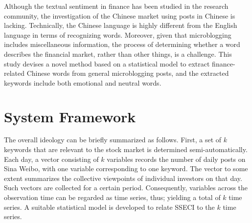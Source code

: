 \documentclass[review,3p,times,12pt,number]{elsarticle}
\begin{document}
\indent
Although the textual sentiment in finance has been studied in the research community, the investigation of the Chinese market using posts in Chinese is lacking. Technically, the Chinese language is highly different from the English language in terms of recognizing words. Moreover, given that microblogging includes miscellaneous information, the process of determining whether a word describes the financial market, rather than other things, is a challenge. This study devises a novel method based on a statistical model to extract finance-related Chinese words from general microblogging posts, and the extracted keywords include both emotional and neutral words.


\section{System Framework}
\label{sec:weibo:sf}
The overall ideology can be briefly summarized as follows. First, a set of $k$ keywords that are relevant to the stock market is determined semi-automatically. Each day, a vector consisting of $k$ variables records the number of daily posts on Sina Weibo, with one variable corresponding to one keyword. The vector to some extent summarizes the collective viewpoints of individual investors on that day. Such vectors are collected for a certain period. Consequently, variables across the observation time can be regarded as time series, thus; yielding a total of $k$ time series. A suitable statistical model is developed to relate SSECI to the $k$ time series. %
\end{document}
